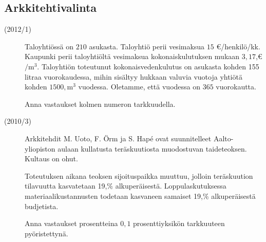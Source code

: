 \subsection*{Arkkitehtivalinta}

\begin{description}
    \item[(2012/1)] Taloyhtiössä on $210$ asukasta. Taloyhtiö perii vesimaksua
        $15$ \euro/henkilö/kk. Kaupunki perii taloyhtiöltä vesimaksua
        kokonaiskulutuksen mukaan $3,17$,\euro $/ \mathrm{m}^3$.
        Taloyhtiön toteutunut kokonaisvedenkulutus on asukasta kohden
        155 litraa vuorokaudessa, mihin sisältyy hukkaan valuvia
        vuotoja yhtiötä kohden $1500,\mathrm{m}^3$ vuodessa. Oletamme,
        että vuodessa on $365$ vuorokautta.
                    
    \begin{alakohdat}
    \end{alakohdat}
    
    Anna vastaukset kolmen numeron tarkkuudella.
\end{description}


\begin{description}
    \item[(2010/3)] Arkkitehdit M. Uoto, F. Örm ja S. Hapé ovat suunnitelleet Aalto-yliopiston aulaan kullatusta teräskuutiosta muodostuvan taideteoksen. Kultaus on ohut.
    
    Toteutuksen aikana teoksen sijoituspaikka muuttuu, jolloin teräskuution tilavuutta kasvatetaan 19,\% alkuperäisestä. Loppulaskutuksessa materiaalikustannusten todetaan kasvaneen samaiset 19,\% alkuperäisestä budjetista.                   
    \begin{alakohdat}
    \end{alakohdat}
    
    Anna vastaukset prosentteina $0,1$ prosenttiyksikön tarkkuuteen pyöristettynä.
\end{description}

